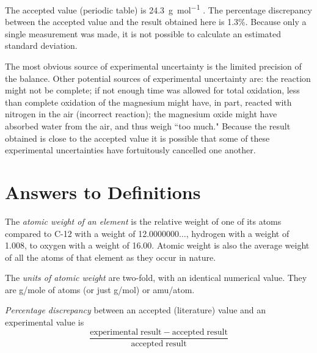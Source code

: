 \documentclass{article}
\begin{document}
The accepted value (periodic table) is \SI{24.3}{\gram\per\mole} \cite{Smith:2012qr}. The percentage discrepancy between the accepted value and the result obtained here is 1.3\%. Because only a single measurement was made, it is not possible to calculate an estimated standard deviation.

The most obvious source of experimental uncertainty is the limited precision of the balance. Other potential sources of experimental uncertainty are: the reaction might not be complete; if not enough time was allowed for total oxidation, less than complete oxidation of the magnesium might have, in part, reacted with nitrogen in the air (incorrect reaction); the magnesium oxide might have absorbed water from the air, and thus weigh ``too much." Because the result obtained is close to the accepted value it is possible that some of these experimental uncertainties have fortuitously cancelled one another.


\section{Answers to Definitions}

\begin{enumerate}
\begin{item}
The \emph{atomic weight of an element} is the relative weight of one of its atoms compared to C-12 with a weight of 12.0000000$\ldots$, hydrogen with a weight of 1.008, to oxygen with a weight of 16.00. Atomic weight is also the average weight of all the atoms of that element as they occur in nature.
\end{item}
\begin{item}
The \emph{units of atomic weight} are two-fold, with an identical numerical value. They are g/mole of atoms (or just g/mol) or amu/atom.
\end{item}
\begin{item}
\emph{Percentage discrepancy} between an accepted (literature) value and an experimental value is
\begin{equation*}
\frac{\mathrm{experimental\;result} - \mathrm{accepted\;result}}{\mathrm{accepted\;result}}
\end{equation*}
\end{item}
\end{enumerate}


%

%

\end{document}
